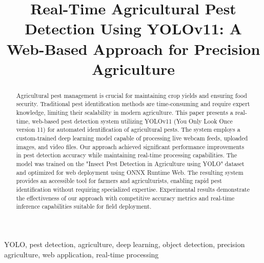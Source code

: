 \documentclass[conference]{IEEEtran}
\begin{document}
\title{Real-Time Agricultural Pest Detection Using YOLOv11: A Web-Based Approach for Precision Agriculture}

\author{
\and
{}
\and
{}
}

\maketitle

\begin{abstract}
Agricultural pest management is crucial for maintaining crop yields and ensuring food security. Traditional pest identification methods are time-consuming and require expert knowledge, limiting their scalability in modern agriculture. This paper presents a real-time, web-based pest detection system utilizing YOLOv11 (You Only Look Once version 11) for automated identification of agricultural pests. The system employs a custom-trained deep learning model capable of processing live webcam feeds, uploaded images, and video files. Our approach achieved significant performance improvements in pest detection accuracy while maintaining real-time processing capabilities. The model was trained on the "Insect Pest Detection in Agriculture using YOLO" dataset and optimized for web deployment using ONNX Runtime Web. The resulting system provides an accessible tool for farmers and agriculturists, enabling rapid pest identification without requiring specialized expertise. Experimental results demonstrate the effectiveness of our approach with competitive accuracy metrics and real-time inference capabilities suitable for field deployment.
\end{abstract}

\begin{IEEEkeywords}
YOLO, pest detection, agriculture, deep learning, object detection, precision agriculture, web application, real-time processing
\end{IEEEkeywords}
\end{document}

